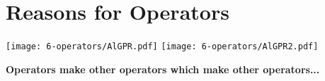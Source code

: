 



\chapter{Reasons for Operators}
\texttt{[image: 6-operators/AlGPR.pdf]}
\newpage
\texttt{[image: 6-operators/AlGPR2.pdf]}
\newpage





\begin{center}
    \textbf{Operators make other operators which make other operators...}
\end{center}


